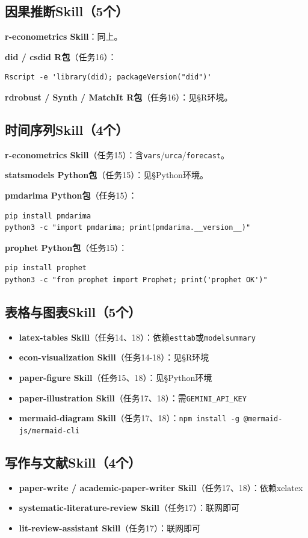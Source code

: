 \subsection{因果推断Skill（5个）}
\textbf{r-econometrics Skill}：同上。

\textbf{did / csdid R包}（任务16）：
\begin{lstlisting}[style=shell]
Rscript -e 'library(did); packageVersion("did")'
\end{lstlisting}
\textbf{rdrobust / Synth / MatchIt R包}（任务16）：见§R环境。

\subsection{时间序列Skill（4个）}
\textbf{r-econometrics Skill}（任务15）：含\texttt{vars}/\texttt{urca}/\texttt{forecast}。

\textbf{statsmodels Python包}（任务15）：见§Python环境。

\textbf{pmdarima Python包}（任务15）：
\begin{lstlisting}[style=shell]
pip install pmdarima
python3 -c "import pmdarima; print(pmdarima.__version__)"
\end{lstlisting}
\textbf{prophet Python包}（任务15）：
\begin{lstlisting}[style=shell]
pip install prophet
python3 -c "from prophet import Prophet; print('prophet OK')"
\end{lstlisting}

\subsection{表格与图表Skill（5个）}
\begin{itemize}[leftmargin=1em]
  \item \textbf{latex-tables Skill}（任务14、18）：依赖\texttt{esttab}或\texttt{modelsummary}
  \item \textbf{econ-visualization Skill}（任务14-18）：见§R环境
  \item \textbf{paper-figure Skill}（任务15、18）：见§Python环境
  \item \textbf{paper-illustration Skill}（任务17、18）：需\texttt{GEMINI\_API\_KEY}
  \item \textbf{mermaid-diagram Skill}（任务17、18）：\texttt{npm install -g @mermaid-js/mermaid-cli}
\end{itemize}

\subsection{写作与文献Skill（4个）}
\begin{itemize}[leftmargin=1em]
  \item \textbf{paper-write / academic-paper-writer Skill}（任务17、18）：依赖xelatex
  \item \textbf{systematic-literature-review Skill}（任务17）：联网即可
  \item \textbf{lit-review-assistant Skill}（任务17）：联网即可
\end{itemize}

